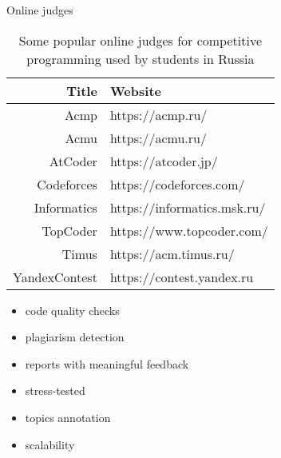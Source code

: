 \documentclass{beamer}%
\begin{document}
\begin{frame}{Online judges}
\begin{changemargin}
\footnotesize



\begin{table}[h]
\centering\begin{tabular}{rl}
\toprule
Title         & Website                     \\
\midrule
Acmp          & https://acmp.ru/            \\
Acmu          & https://acmu.ru/            \\
AtCoder       & https://atcoder.jp/         \\
Codeforces    & https://codeforces.com/     \\
Informatics   & https://informatics.msk.ru/ \\
TopCoder      & https://www.topcoder.com/   \\
Timus         & https://acm.timus.ru/       \\
YandexContest & https://contest.yandex.ru   \\
\bottomrule
\end{tabular}
\caption{Some popular online judges for competitive programming used by students in Russia}
\label{table:online_judges}
\end{table}

\begin{itemize}
\item<1-> code quality checks
\item<1-> plagiarism detection
\item<1-> reports with meaningful feedback
\item<1-> stress-tested
\item<1-> topics annotation
\item<1-> scalability
\end{itemize}




\end{changemargin}
\end{frame}
\end{document}
